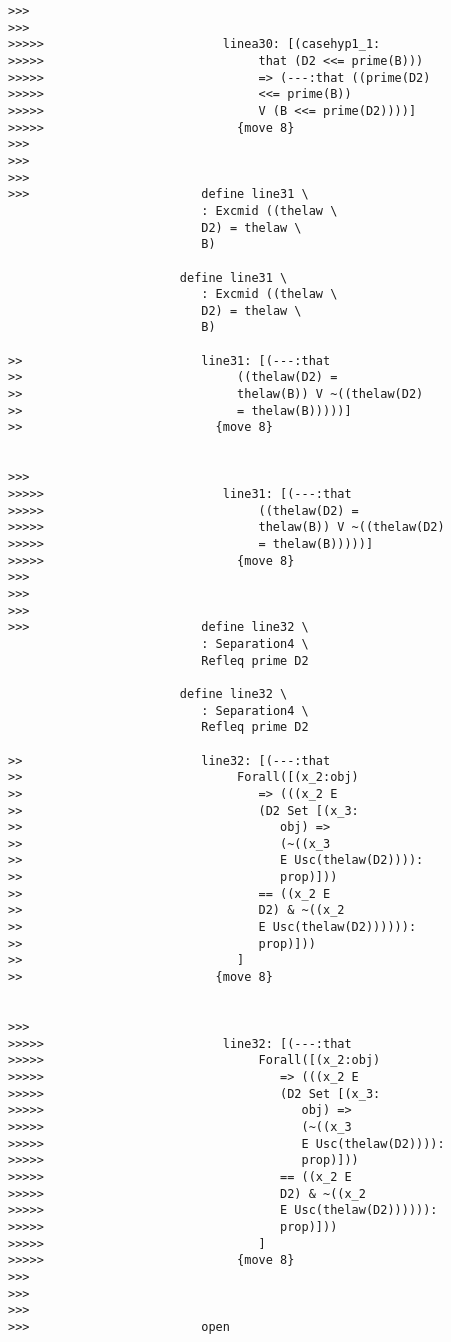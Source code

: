 \documentclass[12pt]{article}
\begin{document}
\begin{verbatim}
>>>
>>>
>>>>>                         linea30: [(casehyp1_1:
>>>>>                              that (D2 <<= prime(B)))
>>>>>                              => (---:that ((prime(D2)
>>>>>                              <<= prime(B))
>>>>>                              V (B <<= prime(D2))))]
>>>>>                           {move 8}
>>>
>>>
>>>
>>>                        define line31 \
                           : Excmid ((thelaw \
                           D2) = thelaw \
                           B)

                        define line31 \
                           : Excmid ((thelaw \
                           D2) = thelaw \
                           B)

>>                         line31: [(---:that
>>                              ((thelaw(D2) =
>>                              thelaw(B)) V ~((thelaw(D2)
>>                              = thelaw(B)))))]
>>                           {move 8}


>>>
>>>>>                         line31: [(---:that
>>>>>                              ((thelaw(D2) =
>>>>>                              thelaw(B)) V ~((thelaw(D2)
>>>>>                              = thelaw(B)))))]
>>>>>                           {move 8}
>>>
>>>
>>>
>>>                        define line32 \
                           : Separation4 \
                           Refleq prime D2

                        define line32 \
                           : Separation4 \
                           Refleq prime D2

>>                         line32: [(---:that
>>                              Forall([(x_2:obj)
>>                                 => (((x_2 E
>>                                 (D2 Set [(x_3:
>>                                    obj) =>
>>                                    (~((x_3
>>                                    E Usc(thelaw(D2)))):
>>                                    prop)]))
>>                                 == ((x_2 E
>>                                 D2) & ~((x_2
>>                                 E Usc(thelaw(D2)))))):
>>                                 prop)]))
>>                              ]
>>                           {move 8}


>>>
>>>>>                         line32: [(---:that
>>>>>                              Forall([(x_2:obj)
>>>>>                                 => (((x_2 E
>>>>>                                 (D2 Set [(x_3:
>>>>>                                    obj) =>
>>>>>                                    (~((x_3
>>>>>                                    E Usc(thelaw(D2)))):
>>>>>                                    prop)]))
>>>>>                                 == ((x_2 E
>>>>>                                 D2) & ~((x_2
>>>>>                                 E Usc(thelaw(D2)))))):
>>>>>                                 prop)]))
>>>>>                              ]
>>>>>                           {move 8}
>>>
>>>
>>>
>>>                        open


\end{verbatim}
\end{document}
